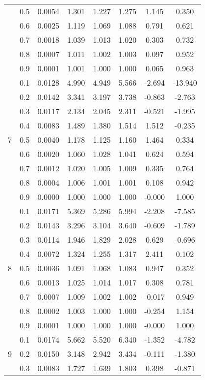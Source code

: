\documentclass[11pt,a4paper]{report}
\begin{document}
\begin{longtable}{ | c | c || c | c | c | c | c | c | }
 & 0.5 & 0.0054 & 1.301 & 1.227 & 1.275 & 1.145 & 0.350 \\
 & 0.6 & 0.0025 & 1.119 & 1.069 & 1.088 & 0.791 & 0.621 \\
 & 0.7 & 0.0018 & 1.039 & 1.013 & 1.020 & 0.303 & 0.732 \\
 & 0.8 & 0.0007 & 1.011 & 1.002 & 1.003 & 0.097 & 0.952 \\
 & 0.9 & 0.0001 & 1.001 & 1.000 & 1.000 & 0.065 & 0.963 \\
 \hline
\multirow{9}{*}{7} & 0.1 & 0.0128 & 4.990 & 4.949 & 5.566 & -2.694 & -13.940 \\
 & 0.2 & 0.0142 & 3.341 & 3.197 & 3.738 & -0.863 & -2.763 \\
 & 0.3 & 0.0117 & 2.134 & 2.045 & 2.311 & -0.521 & -1.995 \\
 & 0.4 & 0.0083 & 1.489 & 1.380 & 1.514 & 1.512 & -0.235 \\
 & 0.5 & 0.0040 & 1.178 & 1.125 & 1.160 & 1.464 & 0.334 \\
 & 0.6 & 0.0020 & 1.060 & 1.028 & 1.041 & 0.624 & 0.594 \\
 & 0.7 & 0.0012 & 1.020 & 1.005 & 1.009 & 0.335 & 0.764 \\
 & 0.8 & 0.0004 & 1.006 & 1.001 & 1.001 & 0.108 & 0.942 \\
 & 0.9 & 0.0000 & 1.000 & 1.000 & 1.000 & -0.000 & 1.000 \\
 \hline
\multirow{9}{*}{8} & 0.1 & 0.0171 & 5.369 & 5.286 & 5.994 & -2.208 & -7.585 \\
 & 0.2 & 0.0143 & 3.296 & 3.104 & 3.640 & -0.609 & -1.789 \\
 & 0.3 & 0.0114 & 1.946 & 1.829 & 2.028 & 0.629 & -0.696 \\
 & 0.4 & 0.0072 & 1.324 & 1.255 & 1.317 & 2.411 & 0.102 \\
 & 0.5 & 0.0036 & 1.091 & 1.068 & 1.083 & 0.947 & 0.352 \\
 & 0.6 & 0.0013 & 1.025 & 1.014 & 1.017 & 0.308 & 0.781 \\
 & 0.7 & 0.0007 & 1.009 & 1.002 & 1.002 & -0.017 & 0.949 \\
 & 0.8 & 0.0002 & 1.003 & 1.000 & 1.000 & -0.254 & 1.154 \\
 & 0.9 & 0.0001 & 1.000 & 1.000 & 1.000 & -0.000 & 1.000 \\
 \hline
\multirow{9}{*}{9} & 0.1 & 0.0174 & 5.662 & 5.520 & 6.340 & -1.352 & -4.782 \\
 & 0.2 & 0.0150 & 3.148 & 2.942 & 3.434 & -0.111 & -1.380 \\
 & 0.3 & 0.0083 & 1.727 & 1.639 & 1.803 & 0.398 & -0.871 \\

\end{longtable}
\end{document}
